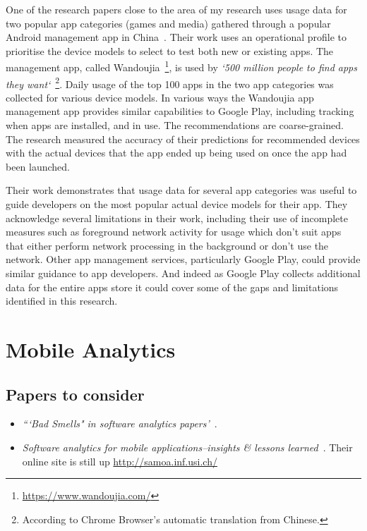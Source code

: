 One of the research papers close to the area of my research uses usage data for two popular app categories (games and media) gathered through a popular Android management app in China~\citep{lu2016_PRADA}. Their work uses an operational profile to prioritise the device models to select to test both new or existing apps. The management app, called Wandoujia~\footnote{\url{https://www.wandoujia.com/}}, is used by \emph{`500 million people to find apps they want`}~\footnote{According to Chrome Browser's automatic translation from Chinese.}. Daily usage of the top 100 apps in the two app categories was collected for various device models. In various ways the Wandoujia app management app provides similar capabilities to Google Play, including tracking when apps are installed, and in use. The recommendations are coarse-grained. The research measured the accuracy of their predictions for recommended devices with the actual devices that the app ended up being used on once the app had been launched. 

Their work demonstrates that usage data for several app categories was useful to guide developers on the most popular actual device models for their app. They acknowledge several limitations in their work, including their use of incomplete measures such as foreground network activity for usage which don't suit apps that either perform network processing in the background or don't use the network. Other app management services, particularly Google Play, could provide similar guidance to app developers. And indeed as Google Play collects additional data for the entire apps store it could cover some of the gaps and limitations identified in this research.


\hypertarget{mobile.analytics}{}
\section{Mobile Analytics}
\label{rw-mobile-analytics-papers}
\subsection{Papers to consider}
\begin{itemize}
    \item \emph{```Bad Smells" in software analytics papers'}~\citep{menzies2019_badsmells_in_software_analytics}.
    \item \emph{Software analytics for mobile applications--insights \& lessons learned}~\citep{minelli2013_software_analytics_samoa}. Their online site is still up \url{http://samoa.inf.usi.ch/}
\end{itemize}

